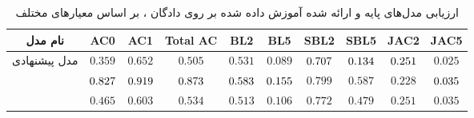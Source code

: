 \begin{table}[!htb]
    \centering
    \caption{
        ارزیابی مدل‌های پایه و ارائه شده آموزش داده شده بر روی دادگان ، بر اساس معیار‌های مختلف}
    \label{table:mr15_result}
    \small\tabcolsep=0.07cm
    \begin{tabular}{||c||c c c|c c|c c|c c||}\hline\hline نام مدل & AC0                        & AC1                        & Total AC                   & BL2                        & BL5                        & SBL2                       & SBL5                       & JAC2                       & JAC5                       \\
        \hline\hline
        مدل پیشنهادی
        & $0.359$                    & $0.652$                    & $0.505$                    & $0.531$                    & $0.089$                    & $\cellcolor{gray!25}0.707$ & $\cellcolor{gray!25}0.134$ & $\cellcolor{gray!25}0.251$ & $0.025$                    \\
        \hline
        \sentigan{}                                    & $\cellcolor{gray!25}0.827$ & $\cellcolor{gray!25}0.919$ & $\cellcolor{gray!25}0.873$ & $\cellcolor{gray!25}0.583$ & $\cellcolor{gray!25}0.155$ & $0.799$                    & $0.587$                    & $0.228$                    & $\cellcolor{gray!25}0.035$ \\
        \hline
        \towardctg{}                                   & $0.465$                    & $0.603$                    & $0.534$                    & $0.513$                    & $0.106$                    & $0.772$                    & $0.479$                    & $0.251$                    & $0.035$                    \\
        \hline
        \hline\end{tabular}\normalsize
\end{table}

